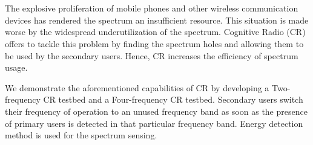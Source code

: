 \chapter*{}
The explosive proliferation of mobile phones and other wireless communication
devices has rendered the spectrum an insufficient resource. This situation is
made worse by the widespread underutilization of the spectrum. Cognitive Radio (CR)
offers to tackle this problem by finding the spectrum holes and allowing them
to be used by the secondary users. Hence, CR increases the efficiency of
spectrum usage.

We demonstrate the aforementioned capabilities of CR by developing a
Two-frequency CR testbed and a Four-frequency CR testbed. Secondary users
switch their frequency of operation to an unused frequency band as soon as the
presence of primary users is detected in that particular frequency band.
Energy detection method is used for the spectrum sensing.